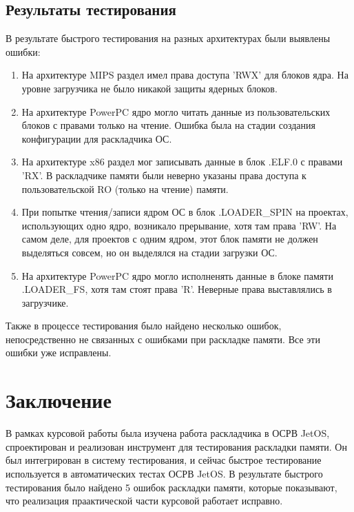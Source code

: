 \documentclass[oneside,senior,etd]{BYUPhys}
\begin{document}
\subsection{Результаты тестирования}

В результате быстрого тестирования на разных архитектурах были выявлены ошибки:

\begin{enumerate}
  \item На архитектуре MIPS раздел имел права доступа 'RWX' для блоков ядра.
  На уровне загрузчика не было никакой защиты ядерных блоков.
  \item На архитектуре PowerPC ядро могло читать данные из пользовательских блоков с правами
  только на чтение. Ошибка была на стадии создания конфигурации для раскладчика ОС.
  \item На архитектуре x86 раздел мог записывать данные в блок .ELF.0 с правами 'RX'.
  В раскладчике памяти были неверно указаны права доступа к пользовательской
  RO (только на чтение) памяти.
  \item При попытке чтения/записи ядром ОС в блок .LOADER\_SPIN на проектах, использующих одно ядро,
  возникало прерывание, хотя там права 'RW'. На самом деле, для проектов с одним ядром,
  этот блок памяти не должен выделяться совсем, но он выделялся на стадии загрузки ОС.
  \item На архитектуре PowerPC ядро могло исполненять данные в блоке памяти\\
  .LOADER\_FS, хотя там стоят права 'R'. Неверные права выставлялись в загрузчике.
\end{enumerate}

Также в процессе тестирования было найдено несколько ошибок, непосредственно
не связанных с ошибками при раскладке памяти. Все эти ошибки уже исправлены.

\section{Заключение}

В рамках курсовой работы была изучена работа раскладчика в ОСРВ JetOS, спроектирован
и реализован инструмент для тестирования раскладки памяти. Он был интегрирован в
систему тестирования, и сейчас быстрое тестирование используется в автоматических тестах
ОСРВ JetOS. В результате быстрого тестирования было найдено 5 ошибок раскладки памяти,
которые показывают, что реализация праактической части курсовой работает исправно.
\end{document}
